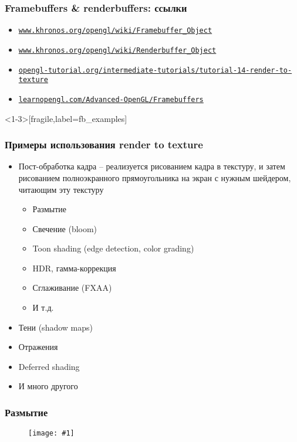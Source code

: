 \documentclass{beamer}
\newcommand{\slideimage}[1]{
  \begin{figure}
    \begin{adjustbox}{width=\textwidth, totalheight=\textheight-2\baselineskip-2\baselineskip,keepaspectratio}
      \texttt{[image: \#1]}
    \end{adjustbox}
  \end{figure}
}
\begin{document}
\begin{frame}[fragile]
\frametitle{Framebuffers \& renderbuffers: ссылки}
\begin{itemize}
\item \href{https://www.khronos.org/opengl/wiki/Framebuffer_Object}{\nolinkurl{www.khronos.org/opengl/wiki/Framebuffer\_Object}}
\item \href{https://www.khronos.org/opengl/wiki/Renderbuffer_Object}{\nolinkurl{www.khronos.org/opengl/wiki/Renderbuffer\_Object}}
\item \href{http://www.opengl-tutorial.org/intermediate-tutorials/tutorial-14-render-to-texture}{\nolinkurl{opengl-tutorial.org/intermediate-tutorials/tutorial-14-render-to-texture}}
\item \href{https://learnopengl.com/Advanced-OpenGL/Framebuffers}{\nolinkurl{learnopengl.com/Advanced-OpenGL/Framebuffers}}
\end{itemize}
\end{frame}

\begin{frame}<1-3>[fragile,label=fb_examples]
\frametitle{Примеры использования render to texture}
\begin{itemize}
\item Пост-обработка кадра -- реализуется рисованием кадра в текстуру, и затем рисованием полноэкранного прямоугольника на экран с нужным шейдером, читающим эту текстуру
\pause
\begin{itemize}
\item Размытие
\pause
\item Свечение (bloom)
\pause
\item Toon shading (edge detection, color grading)
\pause
\item HDR, гамма-коррекция
\pause
\item Сглаживание (FXAA)
\pause
\item И т.д.
\end{itemize}
\pause
\item Тени (shadow maps)
\pause
\item Отражения
\pause
\item Deferred shading
\pause
\item И много другого
\end{itemize}
\end{frame}

\begin{frame}[fragile]
\frametitle{Размытие}
\slideimage{blur.png}
\end{frame}
\end{document}
